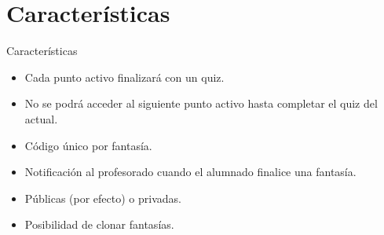 \documentclass{beamer}
\begin{document}
\section{Características}
\begin{frame}{Características}
\begin{itemize}
	\item Cada punto activo finalizará con un quiz.
	\item No se podrá acceder al siguiente punto activo hasta completar el quiz del actual.
	\item Código único por fantasía.
	\item Notificación al profesorado cuando el alumnado finalice una fantasía.
	\item Públicas (por efecto) o privadas.
	\item Posibilidad de clonar fantasías.
\end{itemize}
\end{frame}
\end{document}
